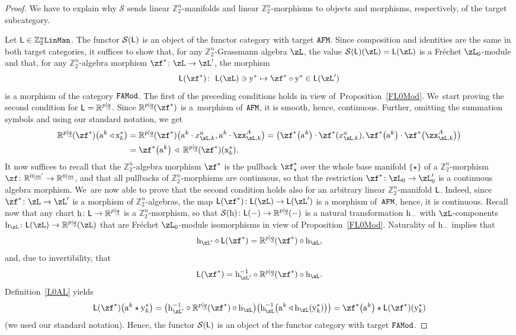 \documentclass[10pt,a4paper]{amsart}
\newcommand{\R}{{\mathbb R}}
\newcommand{\Z}{{\mathbb Z}}
\def\ul{\underline}
\def\ul{\underline}
\newcommand{\0}{\otimes}
\newcommand{\z}{\Z_2^n}
\numberwithin{equation}{section}
\begin{document}
\begin{proof}
We have to explain why $\mathcal{S}$ sends linear $\z$-manifolds and linear $\z$-morphisms to objects and morphisms, respectively, of the target subcategory.

Let ${\sf L}\in\z{\tt LinMan}$. The functor $\mathcal{S}({\sf L})$ is an object of the functor category with target $\tt AFM$. Since composition and identities are the same in both target categories, it suffices to show that, for any $\z$-Grassmann algebra $\zL$, the value $\mathcal{S}({\sf L})(\zL)={\sf L}(\zL)$ is a Fr\'echet $\zL_0$-module and that, for any $\z$-algebra morphism $\zf^*\colon \zL\to \zL'$, the morphism
\[
{\sf L}(\zf^*)\colon\ {\sf L}(\zL)\ni {\rm y}^*\mapsto \zf^*\circ{\rm y}^*\in {\sf L}(\zL')
\]
is a morphism of the category $\tt FAMod$. The first of the preceding conditions holds in view of~Pro\-position~\ref{FL0Mod}. We~start proving the second condition for ${\sf L}=\R^{p|\ul q}$. Since $\R^{p|\ul q}(\zf^*)$ is a~mor\-phism of $\tt AFM$, it is smooth, hence, continuous. Further, omitting the summation symbols and using our standard notation, we get
\begin{align*}
\R^{p|\ul q}(\zf^*)\big({\rm a}^k \triangleleft{\rm x}_k^*\big)& =\R^{p|\ul q}(\zf^*)\big({\rm a}^k\cdot x_{\zL,k}^a,{\rm a}^k\cdot\zx_{\zL,k}^A\big)=\big(\zf^*\big({\rm a}^k\big)\cdot \zf^*(x_{\zL,k}^a),\zf^*\big({\rm a}^k\big)\cdot\zf^*\big(\zx_{\zL,k}^A\big)\big)\nonumber\\
 & = \zf^*\big({\rm a}^k\big)\,\triangleleft\;\R^{p|\ul q}(\zf^*)({\rm x}^*_k) .%
\end{align*}
It now suffices to recall that the $\z$-algebra morphism $\zf^*$ is the pullback $\zf^*_{\star}$ over the whole base manifold $\{\star\}$ of a $\z$-morphism $\zf\colon \R^{0|\ul m'}\to \R^{0|\ul m}$, and that all pullbacks of $\z$-morphisms are continuous, so that the restriction $\zf^*\colon \zL_0\to\zL'_0$ is a continuous algebra morphism. We~are now able to prove that the second condition holds also for an arbitrary linear $\z$-manifold $\sf L$. Indeed, since $\zf^*\colon \zL\to \zL'$ is a morphism of $\z$-algebras, the map ${\sf L}(\zf^*)\colon {\sf L}(\zL)\to {\sf L}(\zL')$ is a morphism of~$\tt AFM$, hence, it is continuous. Recall now that any chart ${\rm h}\colon {\sf L}\to \R^{p|\ul q}$ is a $\z$-morphism, so that $\mathcal{S}({\rm h})\colon {\sf L}(-)\to \R^{p|\ul q}(-)$ is a natural transformation ${\rm h}_-$ with $\zL$-components ${\rm h}_\zL\colon {\sf L}(\zL)\to\R^{p|\ul q}(\zL)$ that are Fr\'echet $\zL_0$-module isomorphisms in view of Proposition~\ref{FL0Mod}. Naturality of ${\rm h}_-$ implies that
\[
{\rm h}_{\zL'}\circ{\sf L}(\zf^*)=\R^{p|\ul q}(\zf^*)\circ {\rm h}_\zL,
\]
and, due to invertibility, that
\[
{\sf L}(\zf^*)={\rm h}_{\zL'}^{-1}\circ\R^{p|\ul q}(\zf^*)\circ {\rm h}_\zL.
\]
Definition~\eqref{L0AL} yields
\[
{\sf L}(\zf^*)\big({\rm a}^k\star {\rm y}^*_k\big)=\big({\rm h}_{\zL'}^{-1}\circ\R^{p|\ul q}(\zf^*)\circ {\rm h}_\zL\big)\big({\rm h}_\zL^{-1}\big({\rm a}^k\triangleleft {\rm h}_\zL({\rm y}^*_k)\big)\big)=\zf^*\big({\rm a}^k\big)\star{\sf L}(\zf^*)({\rm y}^*_k)
\]
(we used our standard notation). Hence, the functor $\mathcal{S}({\sf L})$ is an object of the functor category with target $\tt FAMod$.


\end{proof}
\end{document}
